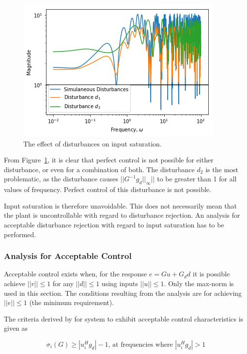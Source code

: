 \begin{figure}[H]
	\centering
	\includegraphics[width=0.7\linewidth]{"Figures/Disturbance Analysis 2 Max Norm"}
	\caption{The effect of disturbances on input saturation.}
	\label{fig:disturbance-analysis-2-max-norm}
\end{figure}

From Figure~\ref{fig:disturbance-analysis-2-max-norm}, it is clear that perfect control is not possible for either disturbance, or even for a combination of both. The disturbance $d_2$ is the most problematic, as the disturbance causes $||G^{-1}g_d||_{\infty}||$ to be greater than 1 for all values of frequency. Perfect control of this disturbance is not possible. 

Input saturation is therefore unavoidable. This does not necessarily mean that the plant is uncontrollable with regard to disturbance rejection. An analysis for acceptable disturbance rejection with regard to input saturation has to be performed.

\subsubsection{Analysis for Acceptable Control}
\label{sec:Analysis for acceptable control:disturbances}
 Acceptable control exists when, for the response $e = Gu+G_dd$ it is possible achieve $||r||\leq1$ for any $||d||\leq1$ using inputs $||u||\leq1$. Only the max-norm is used in this section. The conditions resulting from the analysis are for achieving $||e||\leq1$ (the minimum requirement).
 
 The criteria derived by \textcite{skogestad} for system to exhibit acceptable control characteristics is given as
 
 \begin{equation}
 	\label{eq:Input saturation of disturbances}
 	\sigma_i(G) \geq |u_i^Hg_d| -1 \textrm{, at frequencies where } |u_i^Hg_d|>1
 \end{equation}
 
